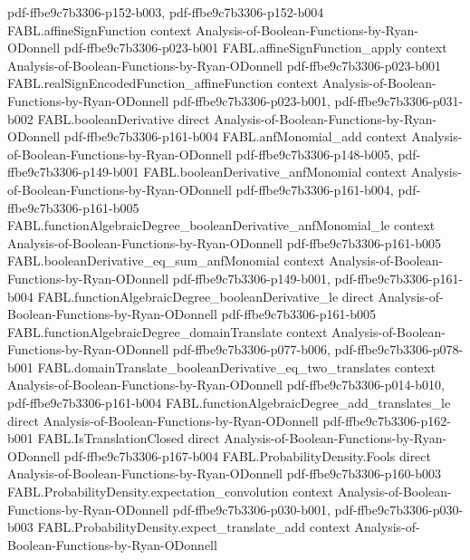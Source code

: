 \begin{theorem}
  {pdf-ffbe9c7b3306-p152-b003,
    pdf-ffbe9c7b3306-p152-b004}
\proofstep
  {FABL.affineSignFunction}
  {context}
  {Analysis-of-Boolean-Functions-by-Ryan-ODonnell}
  {pdf-ffbe9c7b3306-p023-b001}
\proofstep
  {FABL.affineSignFunction_apply}
  {context}
  {Analysis-of-Boolean-Functions-by-Ryan-ODonnell}
  {pdf-ffbe9c7b3306-p023-b001}
\proofstep
  {FABL.realSignEncodedFunction_affineFunction}
  {context}
  {Analysis-of-Boolean-Functions-by-Ryan-ODonnell}
  {pdf-ffbe9c7b3306-p023-b001,
    pdf-ffbe9c7b3306-p031-b002}
\proofstep
  {FABL.booleanDerivative}
  {direct}
  {Analysis-of-Boolean-Functions-by-Ryan-ODonnell}
  {pdf-ffbe9c7b3306-p161-b004}
\proofstep
  {FABL.anfMonomial_add}
  {context}
  {Analysis-of-Boolean-Functions-by-Ryan-ODonnell}
  {pdf-ffbe9c7b3306-p148-b005,
    pdf-ffbe9c7b3306-p149-b001}
\proofstep
  {FABL.booleanDerivative_anfMonomial}
  {context}
  {Analysis-of-Boolean-Functions-by-Ryan-ODonnell}
  {pdf-ffbe9c7b3306-p161-b004,
    pdf-ffbe9c7b3306-p161-b005}
\proofstep
  {FABL.functionAlgebraicDegree_booleanDerivative_anfMonomial_le}
  {context}
  {Analysis-of-Boolean-Functions-by-Ryan-ODonnell}
  {pdf-ffbe9c7b3306-p161-b005}
\proofstep
  {FABL.booleanDerivative_eq_sum_anfMonomial}
  {context}
  {Analysis-of-Boolean-Functions-by-Ryan-ODonnell}
  {pdf-ffbe9c7b3306-p149-b001,
    pdf-ffbe9c7b3306-p161-b004}
\proofstep
  {FABL.functionAlgebraicDegree_booleanDerivative_le}
  {direct}
  {Analysis-of-Boolean-Functions-by-Ryan-ODonnell}
  {pdf-ffbe9c7b3306-p161-b005}
\proofstep
  {FABL.functionAlgebraicDegree_domainTranslate}
  {context}
  {Analysis-of-Boolean-Functions-by-Ryan-ODonnell}
  {pdf-ffbe9c7b3306-p077-b006,
    pdf-ffbe9c7b3306-p078-b001}
\proofstep
  {FABL.domainTranslate_booleanDerivative_eq_two_translates}
  {context}
  {Analysis-of-Boolean-Functions-by-Ryan-ODonnell}
  {pdf-ffbe9c7b3306-p014-b010,
    pdf-ffbe9c7b3306-p161-b004}
\proofstep
  {FABL.functionAlgebraicDegree_add_translates_le}
  {direct}
  {Analysis-of-Boolean-Functions-by-Ryan-ODonnell}
  {pdf-ffbe9c7b3306-p162-b001}
\proofstep
  {FABL.IsTranslationClosed}
  {direct}
  {Analysis-of-Boolean-Functions-by-Ryan-ODonnell}
  {pdf-ffbe9c7b3306-p167-b004}
\proofstep
  {FABL.ProbabilityDensity.Fools}
  {direct}
  {Analysis-of-Boolean-Functions-by-Ryan-ODonnell}
  {pdf-ffbe9c7b3306-p160-b003}
\proofstep
  {FABL.ProbabilityDensity.expectation_convolution}
  {context}
  {Analysis-of-Boolean-Functions-by-Ryan-ODonnell}
  {pdf-ffbe9c7b3306-p030-b001,
    pdf-ffbe9c7b3306-p030-b003}
\proofstep
  {FABL.ProbabilityDensity.expect_translate_add}
  {context}
  {Analysis-of-Boolean-Functions-by-Ryan-ODonnell}

\end{theorem}
